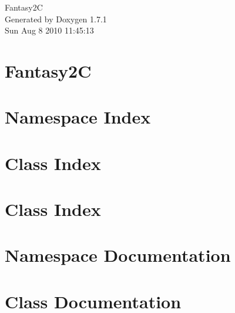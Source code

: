 \documentclass[a4paper]{book}
\begin{document}
\hypersetup{pageanchor=false}
\begin{titlepage}
\vspace*{7cm}
\begin{center}
{\Large Fantasy2C }\\
\vspace*{1cm}
{\large Generated by Doxygen 1.7.1}\\
\vspace*{0.5cm}
{\small Sun Aug 8 2010 11:45:13}\\
\end{center}
\end{titlepage}
\clearemptydoublepage
{}
\tableofcontents
\clearemptydoublepage
{}
\hypersetup{pageanchor=true}
\chapter{Fantasy2C}
\label{index}\hypertarget{index}{}
\chapter{Namespace Index}

\chapter{Class Index}

\chapter{Class Index}

\chapter{Namespace Documentation}







\chapter{Class Documentation}




















\printindex
\end{document}
